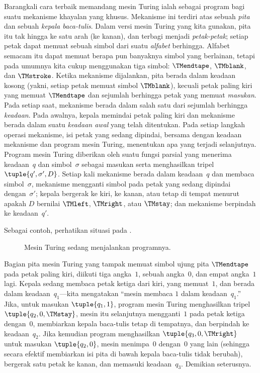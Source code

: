 \documentclass[../../../include/open-logic-section]{subfiles}
\begin{document}
\begin{explain}
Barangkali cara terbaik memandang mesin Turing ialah sebagai program bagi
suatu mekanisme khayalan yang khusus. Mekanisme ini terdiri atas sebuah
\emph{pita} dan sebuah \emph{kepala baca-tulis}. Dalam versi mesin Turing yang
kita gunakan, pita itu tak hingga ke satu arah (ke kanan), dan terbagi menjadi
\emph{petak-petak}; setiap petak dapat memuat sebuah simbol dari suatu
\emph{alfabet} berhingga. Alfabet semacam itu dapat memuat berapa pun banyaknya
simbol yang berlainan, tetapi pada umumnya kita cukup menggunakan tiga simbol:
$\TMendtape$, $\TMblank$, dan $\TMstroke$. Ketika mekanisme dijalankan, pita
berada dalam keadaan kosong (yakni, setiap petak memuat simbol $\TMblank$),
kecuali petak paling kiri yang memuat $\TMendtape$ dan sejumlah berhingga petak
yang memuat \emph{masukan}. Pada setiap saat, mekanisme berada dalam salah satu
dari sejumlah berhingga \emph{keadaan}. Pada awalnya, kepala memindai petak
paling kiri dan mekanisme berada dalam suatu \emph{keadaan awal} yang telah
ditentukan. Pada setiap langkah operasi mekanisme, isi petak yang sedang
dipindai, bersama dengan keadaan mekanisme dan program mesin Turing,
menentukan apa yang terjadi selanjutnya. Program mesin Turing diberikan oleh
suatu fungsi parsial yang menerima keadaan~$q$ dan simbol~$\sigma$ sebagai
masukan serta menghasilkan tripel~$\tuple{q', \sigma', D}$. Setiap kali
mekanisme berada dalam keadaan~$q$ dan membaca simbol~$\sigma$, mekanisme
mengganti simbol pada petak yang sedang dipindai dengan~$\sigma'$; kepala
bergerak ke kiri, ke kanan, atau tetap di tempat menurut apakah $D$ bernilai
$\TMleft$, $\TMright$, atau $\TMstay$; dan mekanisme berpindah ke keadaan~$q'$.

Sebagai contoh, perhatikan situasi pada .
\begin{figure}
  \caption{Mesin Turing sedang menjalankan programnya.}
\end{figure}
Bagian pita mesin Turing yang tampak memuat simbol ujung pita $\TMendtape$ pada
petak paling kiri, diikuti tiga angka~$1$, sebuah angka~$0$, dan empat angka~$1$
lagi. Kepala sedang membaca petak ketiga dari kiri, yang memuat~$1$, dan berada
dalam keadaan~$q_1$---kita mengatakan ``mesin membaca $1$ dalam keadaan~$q_1$.''
Jika, untuk masukan $\tuple{q_1, 1}$, program mesin Turing menghasilkan tripel
$\tuple{q_2, 0, \TMstay}$, mesin itu selanjutnya mengganti~$1$ pada petak ketiga
dengan~$0$, membiarkan kepala baca-tulis tetap di tempatnya, dan berpindah ke
keadaan~$q_2$. Jika kemudian program menghasilkan $\tuple{q_3, 0, \TMright}$
untuk masukan $\tuple{q_2, 0}$, mesin menimpa~$0$ dengan~$0$ yang lain (sehingga
secara efektif membiarkan isi pita di bawah kepala baca-tulis tidak berubah),
bergerak satu petak ke kanan, dan memasuki keadaan~$q_3$. Demikian seterusnya.


\end{explain}
\end{document}
